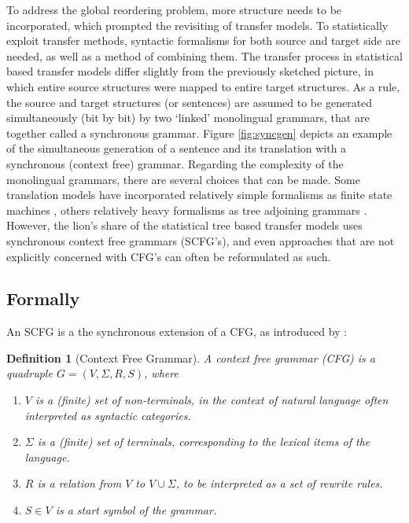 \documentclass{report}
\theoremstyle{break}
\newtheorem{definition}{Definition}
\begin{document}
To address the global reordering problem, more structure needs to be incorporated, which prompted the revisiting of transfer models. To statistically exploit transfer methods, syntactic formalisms for both source and target side are needed, as well as a method of combining them. The transfer process in statistical based transfer models differ slightly from the previously sketched picture, in which entire source structures were mapped to entire target structures. As a rule, the source and target structures (or sentences) are assumed to be generated simultaneously (bit by bit) by two `linked' monolingual grammars, that are together called a synchronous grammar.
 Figure \ref{fig:syncgen} depicts an example of the simultaneous generation of a sentence and its translation with a synchronous (context free) grammar. Regarding the complexity of the monolingual grammars, there are several choices that can be made. Some translation models have incorporated relatively simple formalisms as finite state machines \citep[e.g.,][]{alshawi2000learning}, others relatively heavy formalisms as tree adjoining grammars \citep[e.g.,][based a translation model on DOP]{poutsma2000data}. However, the lion's share of the statistical tree based transfer models uses synchronous context free grammars (SCFG's), and even approaches that are not explicitly concerned with CFG's can often be reformulated as such.
 
\subsection{Formally}

An SCFG is a the synchronous extension of a CFG, as introduced by \cite{chomsky1956three}:

\begin{definition}[Context Free Grammar]
A context free grammar (CFG) is a quadruple $G = (V, \Sigma, R, S)$, where\begin{enumerate}
\item $V$ is a (finite) set of non-terminals, in the context of natural language often interpreted as syntactic categories.
\item $\Sigma$ is a (finite) set of terminals, corresponding to the lexical items of the language.
\item $R$ is a relation from $V$ to $V\cup\Sigma$, to be interpreted as a set of rewrite rules.
\item $S\in V$ is a start symbol of the grammar.
\end{enumerate}
\end{definition}
\end{document}
